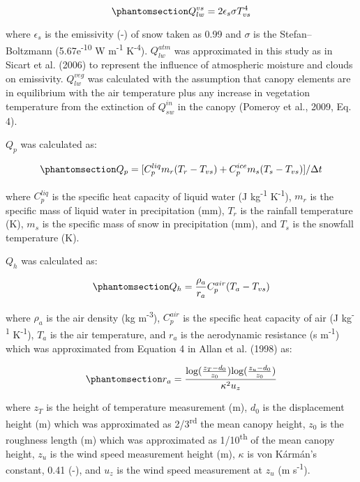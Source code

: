 \documentclass[
]{agujournal2019}
\begin{document}
\begin{equation}\phantomsection\label{eq-lw-vs}{
Q_{lw}^{vs} = 2 \epsilon_{s} \sigma T_{vs}^4
}\end{equation}

where \(\epsilon_s\) is the emissivity (-) of snow taken as 0.99 and
\(\sigma\) is the Stefan--Boltzmann (5.67e\textsuperscript{-10} W
m\textsuperscript{-1} K\textsuperscript{-4}). \(Q_{lw}^{atm}\) was
approximated in this study as in Sicart et al. (2006) to represent the
influence of atmospheric moisture and clouds on emissivity.
\(Q_{lw}^{veg}\) was calculated with the assumption that canopy elements
are in equilibrium with the air temperature plus any increase in
vegetation temperature from the extinction of \(Q_{sw}^{in}\) in the
canopy (Pomeroy et al., 2009, Eq. 4).

\(Q_p\) was calculated as:

\begin{equation}\phantomsection\label{eq-qp}{
Q_p = [C_p^{liq} m_r(T_r - T_{vs}) + C_p^{ice} m_s(T_s - T_{vs})] / \Delta t
}\end{equation}

where \(C_p^{liq}\) is the specific heat capacity of liquid water (J
kg\textsuperscript{-1} K\textsuperscript{-1}), \(m_r\) is the specific
mass of liquid water in precipitation (mm), \(T_r\) is the rainfall
temperature (K), \(m_s\) is the specific mass of snow in precipitation
(mm), and \(T_s\) is the snowfall temperature (K).

\(Q_h\) was calculated as:

\begin{equation}\phantomsection\label{eq-qh}{
Q_h = \frac{\rho_a}{r_a} C_p^{air} (T_a - T_{vs})
}\end{equation}

where \(\rho_a\) is the air density (kg m\textsuperscript{-3}),
\(C_p^{air}\) is the specific heat capacity of air (J
kg\textsuperscript{-1} K\textsuperscript{-1}), \(T_a\) is the air
temperature, and \(r_a\) is the aerodynamic resistance (s
m\textsuperscript{-1}) which was approximated from Equation 4 in Allan
et al. (1998) as:

\begin{equation}\phantomsection\label{eq-ra}{
r_a = \frac{\text{log}(\frac{z_T - d_0}{z_0})\text{log}(\frac{z_u - d_0}{z_0})}{\kappa^2 u_z}
}\end{equation}

where \(z_T\) is the height of temperature measurement (m), \(d_0\) is
the displacement height (m) which was approximated as
2/3\textsuperscript{rd} the mean canopy height, \(z_0\) is the roughness
length (m) which was approximated as 1/10\textsuperscript{th} of the
mean canopy height, \(z_u\) is the wind speed measurement height (m),
\(\kappa\) is von Kármán's constant, 0.41 (-), and \(u_z\) is the wind
speed measurement at \(z_u\) (m s\textsuperscript{-1}).
\end{document}
